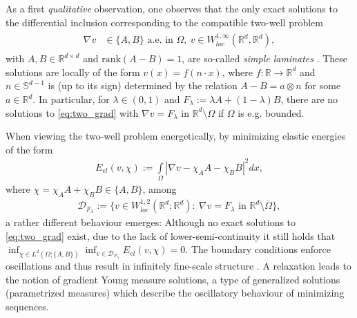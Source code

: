 \documentclass[a4paper, 10pt, twoside, notitlepage]{amsart}
\theoremstyle{plain}
\newcommand{\R}{\mathbb{R}}
\begin{document}
	As a first \emph{qualitative} observation, one observes that the only exact solutions to the differential inclusion corresponding to the compatible two-well problem
	\begin{align}
		\label{eq:two_grad}
		\begin{split}
			\nabla v &\in \{A,B\} \mbox{ a.e. in } \Omega, \ v\in W^{1,\infty}_{loc}(\R^d, \R^d),
		\end{split}
	\end{align}
	with $A,B\in \R^{d \times d}$ and $\text{rank}(A-B)=1$, are so-called \emph{simple laminates}
	\cite{BJ92, M1}. These  solutions are locally of the form $v(x)= f(n\cdot x)$, where $f: \R \rightarrow \R^d$ and $n\in \mathbb{S}^{d-1}$ is (up to its sign) determined by the relation $A-B = a\otimes n$ for
	some $a\in \R^d$. In particular, for $\lambda \in (0,1)$ and $F_{\lambda}:= \lambda A + (1-\lambda) B$, there are no solutions to \eqref{eq:two_grad} with $\nabla v = F_{\lambda}$ in $\R^d\setminus\Omega$ if $\Omega$ is e.g. bounded.
	
	When viewing the two-well problem energetically, by minimizing elastic energies of the form
	\begin{align*}
		E_{el}( v, \chi):= \int\limits_{\Omega} |\nabla v - \chi_A A - \chi_B B|^2 dx,
	\end{align*}
	where $\chi = \chi_A A + \chi_B B \in \{A,B\}$, among
	\begin{align*}
		\mathcal{D}_{F_{\lambda}} :=\{v \in W^{1,2}_{loc}(\R^d; \R^d): \ \nabla v = F_{\lambda} \mbox{ in } \R^d \setminus \overline{\Omega}\},
	\end{align*}
	a rather different behaviour emerges: Although no exact solutions to \eqref{eq:two_grad} exist, due to the lack of lower-semi-continuity it still holds that
	$\inf_{\chi \in L^2(\Omega;\{A,B\})}\inf_{v \in \mathcal{D}_{F_\lambda}}E_{el}(v,\chi)=0$. The boundary conditions enforce oscillations and thus result in infinitely fine-scale structure \cite{BJ92,M1,B}. A
	relaxation leads to the notion of gradient Young measure solutions, a type of generalized solutions (parametrized measures) which describe the oscillatory behaviour of minimizing sequences.
	
\end{document}
